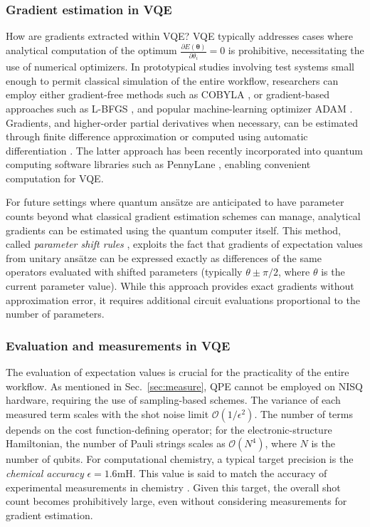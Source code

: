 \documentclass[../main.tex]{subfiles}
\begin{document}
\subsubsection{Gradient estimation in VQE}

How are gradients extracted within VQE? VQE typically addresses cases where analytical computation of the optimum $\frac{\partial E(\bm{\theta})}{\partial \theta_i} = 0$ is prohibitive, necessitating the use of numerical optimizers. In prototypical studies involving test systems small enough to permit classical simulation of the entire workflow, researchers can employ either gradient-free methods such as COBYLA \cite{ragonneau2023pdfo:}, or gradient-based approaches such as L-BFGS \cite{liu1989on}, and popular machine-learning optimizer ADAM \cite{kingma2014adam}. Gradients, and higher-order partial derivatives when necessary, can be estimated through finite difference approximation or computed using automatic differentiation \cite{paszke2017automatic}. The latter approach has been recently incorporated into quantum computing software libraries such as PennyLane \cite{bergholm2018pennylane}, enabling convenient computation for VQE.

For future settings where quantum ansätze are anticipated to have parameter counts beyond what classical gradient estimation schemes can manage, analytical gradients can be estimated using the quantum computer itself. This method, called \textit{parameter shift rules} \cite{mitarai2018quantum, schuld2018evaluating}, exploits the fact that gradients of expectation values from unitary ansätze can be expressed exactly as differences of the same operators evaluated with shifted parameters (typically $\theta \pm \pi/2$, where $\theta$ is the current parameter value). While this approach provides exact gradients without approximation error, it requires additional circuit evaluations proportional to the number of parameters.

\subsubsection{Evaluation and measurements in VQE}

The evaluation of expectation values is crucial for the practicality of the entire workflow. As mentioned in Sec.~\ref{sec:measure}, \ac{QPE} cannot be employed on NISQ hardware, requiring the use of sampling-based schemes. The variance of each measured term scales with the shot noise limit $\mathcal{O}(1/\epsilon^2)$. The number of terms depends on the cost function-defining operator; for the electronic-structure Hamiltonian, the number of Pauli strings scales as $\mathcal{O}(N^4)$, where $N$ is the number of qubits. For computational chemistry, a typical target precision is the \textit{chemical accuracy} $\epsilon = 1.6 \mathrm{mH}$. This value is said to match the accuracy of experimental measurements in chemistry \cite{pople1999nobel}. Given this target, the overall shot count becomes prohibitively large, even without considering measurements for gradient estimation. 
\end{document}
